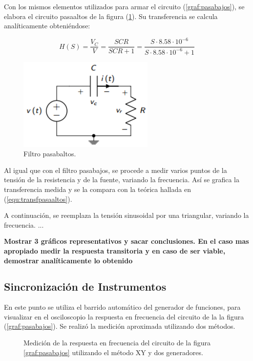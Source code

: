 \documentclass[a4paper]{article}
\begin{document}
Con los mismos elementos utilizados para armar el circuito (\ref{graf:pasabajos}), se elabora el circuito pasaaltos de la figura (\ref{graf:pasaaltos}). Su transferencia se calcula analíticamente obteniéndose:

\begin{equation}
	H \left(S \right) = \frac{V_C}{V} = \frac{SCR}{SCR + 1} = \frac{S \cdot 8.58 \cdot 10^{-6}}{S \cdot 8.58 \cdot 10^{-6} + 1}
	\label{equ:transfpasaaltos}
\end{equation}

\begin{figure}[H]
	\centering
	\includegraphics[width=0.6\textwidth]{Filtro-pasaaltos.PNG}
	\caption{Filtro pasabaltos.} 
	\label{graf:pasaaltos}
\end{figure}

Al igual que con el filtro pasabajos, se procede a medir varios puntos de la tensión de la resistencia y de la fuente, variando la frecuencia. Así se grafica la transferencia medida y se la compara con la teórica hallada en (\ref{equ:transfpasaaltos}).

A continuación, se reemplaza la tensión sinusoidal por una triangular, variando la frecuencia. ...

\textbf{Mostrar 3 gráficos representativos y sacar conclusiones. En el caso mas apropiado medir la respuesta transitoria y en caso de ser viable, demostrar analíticamente lo obtenido}

\subsection*{Sincronización de Instrumentos}
En este punto se utiliza el barrido automático del generador de funciones, para visualizar en el osciloscopio la respuesta en frecuencia del circuito de la la figura (\ref{graf:pasabajos}). Se realizó la medición aproximada utilizando dos métodos.

\begin{figure}[H]
	\centering
	\caption{Medición de la respuesta en frecuencia del circuito de la figura \ref{graf:pasabajos} utilizando el método XY y dos generadores.} 
	\label{graf:osci_freq_alta}
\end{figure}
\end{document}
